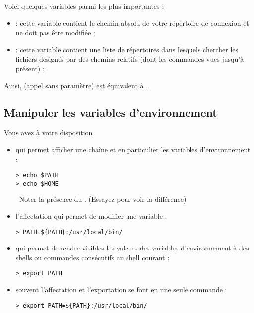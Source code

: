 \documentclass[11pt,a4paper]{article}
\begin{document}
Voici quelques variables parmi les plus importantes :
\begin{itemize}
 \item {}    : cette variable contient le chemin absolu de
                       votre répertoire de connexion et ne doit pas être
                       modifiée ;
 \item {}    : cette variable contient une liste de répertoires dans
                       lesquels chercher les fichiers désignés par des chemins
                       relatifs (dont les commandes vues jusqu'à présent) ;
\end{itemize}
Ainsi,  (appel sans paramètre) est équivalent à
.

\subsection{Manipuler les variables d'environnement}

Vous avez à votre disposition
\begin{itemize}
\item {} qui permet afficher une chaîne et en particulier les
variables d'environnement :
\begin{verbatim}
> echo $PATH
> echo $HOME
\end{verbatim}

\smallskip
\
Noter la présence du \cmd{\$}. (Essayez  pour
voir la différence)
\item l'affectation \cmd{=} qui permet de modifier une variable :
\begin{verbatim}
> PATH=${PATH}:/usr/local/bin/
\end{verbatim}
\item {} qui permet de rendre visibles les valeurs des variables
d'environnement à des shells ou commandes consécutifs au shell courant :
\begin{verbatim}
> export PATH
\end{verbatim}
\item souvent l'affectation et l'exportation se font en une seule commande :
\begin{verbatim}
> export PATH=${PATH}:/usr/local/bin/
\end{verbatim}
\end{itemize}
\end{document}
